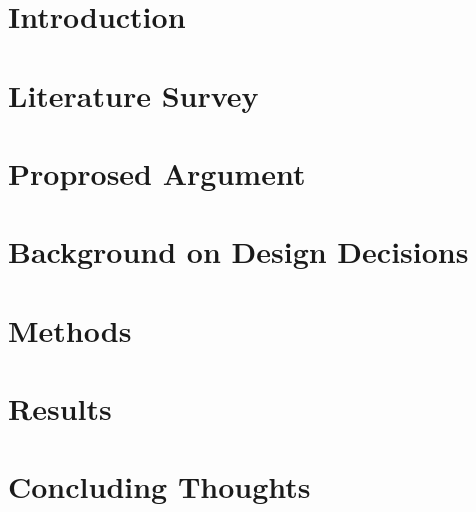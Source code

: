 \documentclass[12pt]{report}
\begin{document}
\normalem       %

\chapter{\normalsize Introduction}


\chapter{\normalsize Literature Survey}


\chapter{\normalsize Proprosed Argument}


\chapter{\normalsize Background on Design Decisions}


\chapter{\normalsize Methods}


\chapter{\normalsize Results}


\chapter{\normalsize Concluding Thoughts}

\end{document}
